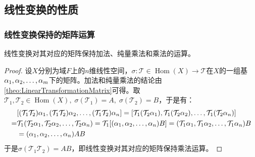 \subsection{线性变换的性质}
\subsubsection{线性变换保持的矩阵运算}
\begin{theorem}
	线性变换对其对应的矩阵保持加法、纯量乘法和乘法的运算。
\end{theorem}
\begin{proof}
	设$X$分别为域$F$上的$n$维线性空间，$\sigma:\mathcal{T}\in\operatorname{Hom}(X)\longrightarrow\mathcal{T}$在$X$的一组基$\alpha_1, \alpha_2, \dots, \alpha_{m}$下的矩阵。加法和纯量乘法的结论由\cref{theo:LinearTransformationMatrix}可得。取$\mathcal{T}_1,\mathcal{T}_2\in\operatorname{Hom}(X),\;\sigma(\mathcal{T}_1)=A,\;\sigma(\mathcal{T}_2)=B$，于是有：
	\begin{align*}
		&[(\mathcal{T}_1\mathcal{T}_2)\alpha_1, (\mathcal{T}_1\mathcal{T}_2)\alpha_2, \dots, (\mathcal{T}_1\mathcal{T}_2)\alpha_{n}]
		=[\mathcal{T}_1(\mathcal{T}_2\alpha_1),\mathcal{T}_1(\mathcal{T}_2\alpha_2),\dots,\mathcal{T}_1(\mathcal{T}_2\alpha_n)] \\
		=&\mathcal{T}_1(\mathcal{T}_2\alpha_1, \mathcal{T}_2\alpha_2, \dots, \mathcal{T}_2\alpha_{n}) =\mathcal{T}_1[(\alpha_1, \alpha_2, \dots, \alpha_{n})B] =(\mathcal{T}_1\alpha_1, \mathcal{T}_1\alpha_2, \dots, \mathcal{T}_1\alpha_{n})B \\
		&=(\alpha_1, \alpha_2, \dots, \alpha_{n})AB
	\end{align*}
	于是$\sigma(\mathcal{T}_1\mathcal{T}_2)=AB$，即线性变换对其对应的矩阵保持乘法运算。
\end{proof}
